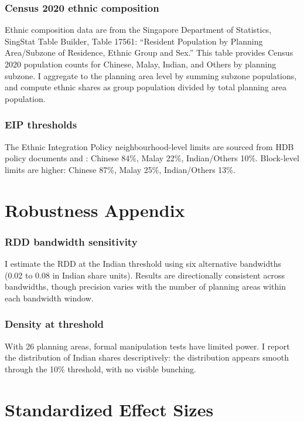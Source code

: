 \documentclass[12pt]{article}
\begin{document}
\subsubsection*{Census 2020 ethnic composition} Ethnic composition data are from the Singapore Department of Statistics, SingStat Table Builder, Table 17561: ``Resident Population by Planning Area/Subzone of Residence, Ethnic Group and Sex.'' This table provides Census 2020 population counts for Chinese, Malay, Indian, and Others by planning subzone. I aggregate to the planning area level by summing subzone populations, and compute ethnic shares as group population divided by total planning area population.

\subsubsection*{EIP thresholds} The Ethnic Integration Policy neighbourhood-level limits are sourced from HDB policy documents and \citet{sim2003}: Chinese 84\%, Malay 22\%, Indian/Others 10\%. Block-level limits are higher: Chinese 87\%, Malay 25\%, Indian/Others 13\%.

\section{Robustness Appendix}

\subsubsection*{RDD bandwidth sensitivity} I estimate the RDD at the Indian threshold using six alternative bandwidths (0.02 to 0.08 in Indian share units). Results are directionally consistent across bandwidths, though precision varies with the number of planning areas within each bandwidth window.

\subsubsection*{Density at threshold} With 26 planning areas, formal manipulation tests \citep{mccrary2008, cattaneojansson2020} have limited power. I report the distribution of Indian shares descriptively: the distribution appears smooth through the 10\% threshold, with no visible bunching.

\section{Standardized Effect Sizes}
\label{sec:sde}


\end{document}
